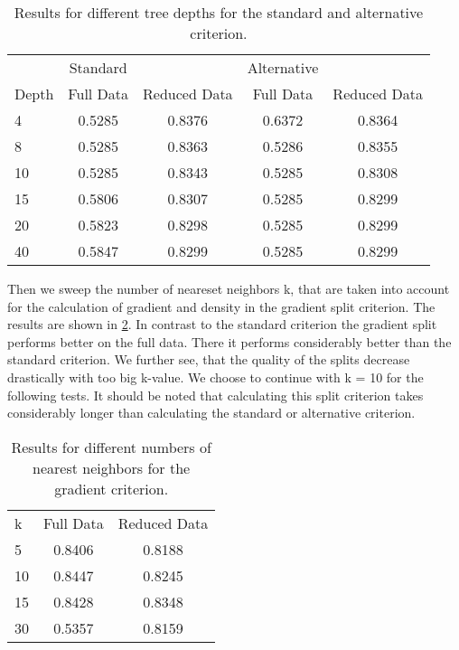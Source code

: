 \documentclass{article}
\begin{document}
\begin{table}[h]
	\centering
	\begin{tabular}{l c c c c}
				&   Standard  &					& 	Alternative	&				\\
		Depth	&	Full Data & Reduced Data	& 	Full Data	& Reduced Data	\\
		  4		&	0.5285	  &	0.8376			&	0.6372		&	0.8364		\\
		  8 	& 	0.5285	  & 0.8363			&	0.5286		&	0.8355		\\
		  10	&   0.5285	  & 0.8343			&	0.5285		&	0.8308		\\
		  15	& 	0.5806	  & 0.8307			&	0.5285		&	0.8299		\\
		  20	&   0.5823	  & 0.8298			&	0.5285		&	0.8299		\\
		  40	&	0.5847	  & 0.8299			&	0.5285		&	0.8299		\\
	\end{tabular}
	\caption{Results for different tree depths for the standard and alternative criterion.}
	\label{tab3}
\end{table}

Then we sweep the number of neareset neighbors k, that are taken into account for the calculation 
of gradient and density in the gradient split criterion.
\newline
The results are shown in \ref{tab4}. In contrast to the standard criterion the gradient split 
performs better on the full data. There it performs considerably better than the standard criterion.
We further see, that the quality of the splits decrease drastically with too big k-value.
We choose to continue with k = 10 for the following tests.
\newline
It should be noted that calculating this split criterion takes considerably longer than calculating
the standard or alternative criterion.

\begin{table}[h]
	\centering
	\begin{tabular}{l c c}
		  k		&	Full Data & Reduced Data	\\
		  5		&	0.8406	  &	0.8188			\\
	 	  10 	& 	0.8447	  & 0.8245			\\
		  15	&   0.8428	  & 0.8348			\\
		  30	& 	0.5357	  & 0.8159			\\
	\end{tabular}
	\caption{Results for different numbers of nearest neighbors for the gradient criterion.}
	\label{tab4}
\end{table}
\end{document}
